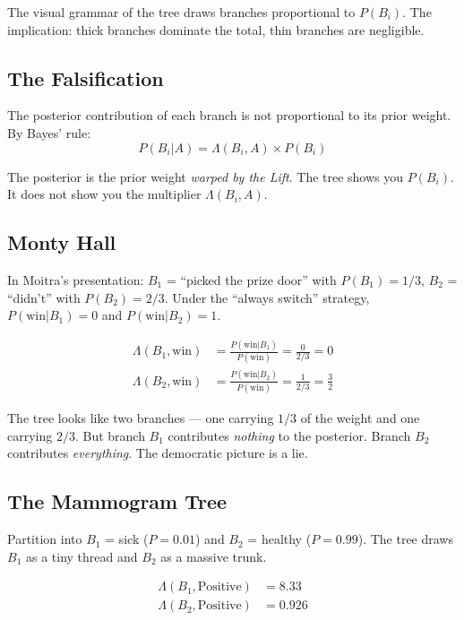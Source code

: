 \documentclass[12pt]{article}
\begin{document}
The visual grammar of the tree draws branches proportional to $P(B_i)$. The implication: thick branches dominate the total, thin branches are negligible.

\subsection{The Falsification}

The posterior contribution of each branch is not proportional to its prior weight. By Bayes' rule:
\begin{equation}
P(B_i | A) = \Lambda(B_i, A) \times P(B_i)
\end{equation}

The posterior is the prior weight \textit{warped by the Lift}. The tree shows you $P(B_i)$. It does not show you the multiplier $\Lambda(B_i, A)$.

\subsection{Monty Hall}

In Moitra's presentation: $B_1$ = ``picked the prize door'' with $P(B_1) = 1/3$, $B_2$ = ``didn't'' with $P(B_2) = 2/3$. Under the ``always switch'' strategy, $P(\text{win}|B_1) = 0$ and $P(\text{win}|B_2) = 1$.

\begin{align}
\Lambda(B_1, \text{win}) &= \frac{P(\text{win}|B_1)}{P(\text{win})} = \frac{0}{2/3} = 0 \\[4pt]
\Lambda(B_2, \text{win}) &= \frac{P(\text{win}|B_2)}{P(\text{win})} = \frac{1}{2/3} = \frac{3}{2}
\end{align}

The tree looks like two branches --- one carrying $1/3$ of the weight and one carrying $2/3$. But branch $B_1$ contributes \textit{nothing} to the posterior. Branch $B_2$ contributes \textit{everything}. The democratic picture is a lie.

\subsection{The Mammogram Tree}

Partition into $B_1$ = sick ($P = 0.01$) and $B_2$ = healthy ($P = 0.99$). The tree draws $B_1$ as a tiny thread and $B_2$ as a massive trunk.

\begin{align}
\Lambda(B_1, \text{Positive}) &= 8.33 \\
\Lambda(B_2, \text{Positive}) &= 0.926
\end{align}
\end{document}
